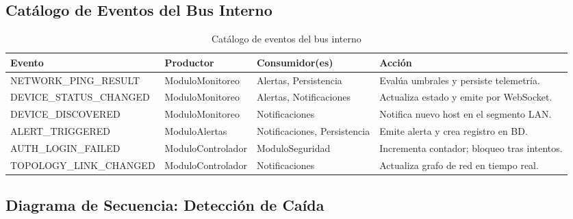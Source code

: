 \documentclass[12pt,a4paper]{report}
\begin{document}
\subsection{Catálogo de Eventos del Bus Interno}

\begin{table}[htbp]
\centering
\caption{Catálogo de eventos del bus interno}\label{tab:catalogo_eventos}
\small
\begin{tabularx}{\textwidth}{>{\raggedright\arraybackslash\ttfamily\footnotesize}p{3.8cm} >{\raggedright\arraybackslash\small}p{2.9cm} >{\raggedright\arraybackslash\small}p{3.4cm} >{\raggedright\arraybackslash\small}X}
\toprule
\textbf{\textnormal{\textsf{\textbf{Evento}}}} & \textbf{\textnormal{\textsf{\textbf{Productor}}}} & \textbf{\textnormal{\textsf{\textbf{Consumidor(es)}}}} & \textbf{\textnormal{\textsf{\textbf{Acción}}}} \\
\midrule
NETWORK\_PING\_RESULT & ModuloMonitoreo & Alertas, Persistencia & Evalúa umbrales y persiste telemetría. \\
\midrule
DEVICE\_STATUS\_CHANGED & ModuloMonitoreo & Alertas, Notificaciones & Actualiza estado y emite por WebSocket. \\
\midrule
DEVICE\_DISCOVERED & ModuloMonitoreo & Notificaciones & Notifica nuevo host en el segmento LAN. \\
\midrule
ALERT\_TRIGGERED & ModuloAlertas & Notificaciones, Persistencia & Emite alerta y crea registro en BD. \\
\midrule
AUTH\_LOGIN\_FAILED & ModuloControlador & ModuloSeguridad & Incrementa contador; bloqueo tras intentos. \\
\midrule
TOPOLOGY\_LINK\_CHANGED & ModuloControlador & Notificaciones & Actualiza grafo de red en tiempo real. \\
\bottomrule
\end{tabularx}
\end{table}

\subsection{Diagrama de Secuencia: Detección de Caída}
\end{document}
